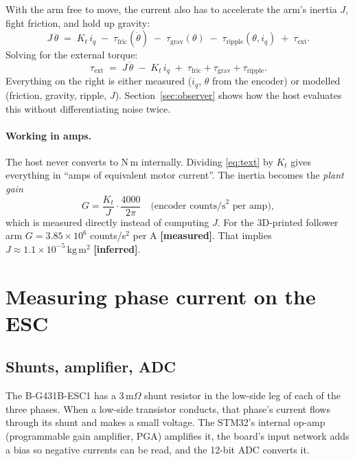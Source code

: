 \documentclass[11pt,a4paper]{article}
\newcommand{\iq}{i_q}
\newcommand{\measured}{\textcolor{teal!70!black}{\textbf{[measured]}}}
\newcommand{\inferred}{\textcolor{orange!80!black}{\textbf{[inferred]}}}
\begin{document}
With the arm free to move, the current also has to accelerate the arm's
inertia $J$, fight friction, and hold up gravity:
\begin{equation}
  J\,\ddot\theta \;=\; K_t\,\iq \;-\; \tau_{\mathrm{fric}}(\dot\theta)
  \;-\; \tau_{\mathrm{grav}}(\theta) \;-\; \tau_{\mathrm{ripple}}(\theta,\iq)
  \;+\; \tau_{\mathrm{ext}} .
  \label{eq:newton}
\end{equation}
Solving for the external torque:
\begin{equation}
  \tau_{\mathrm{ext}} \;=\; J\,\ddot\theta \;-\; K_t\,\iq
  \;+\; \tau_{\mathrm{fric}} + \tau_{\mathrm{grav}} + \tau_{\mathrm{ripple}} .
  \label{eq:text}
\end{equation}
Everything on the right is either measured ($\iq$, $\theta$ from the
encoder) or modelled (friction, gravity, ripple, $J$). Section~\ref{sec:observer}
shows how the host evaluates this without differentiating noise twice.

\paragraph{Working in amps.} The host never converts to N\,m internally.
Dividing \eqref{eq:text} by $K_t$ gives everything in ``amps of equivalent
motor current''. The inertia becomes the \emph{plant gain}
\[
  G = \frac{K_t}{J}\cdot\frac{4000}{2\pi}
  \quad\text{(encoder counts/s}^2\text{ per amp)},
\]
which is measured directly instead of computing $J$. For the 3D-printed
follower arm $G = 3.85\times10^{6}$ counts/s$^2$ per A \measured. That
implies $J \approx 1.1\times10^{-5}\,\mathrm{kg\,m^2}$ \inferred.

\section{Measuring phase current on the ESC}

\subsection{Shunts, amplifier, ADC}

The B-G431B-ESC1 has a 3\,m$\Omega$ shunt resistor in the low-side leg of
each of the three phases. When a low-side transistor conducts, that
phase's current flows through its shunt and makes a small voltage. The
STM32's internal op-amp (programmable gain amplifier, PGA) amplifies it,
the board's input network adds a bias so negative currents can be read,
and the 12-bit ADC converts it.
\end{document}
